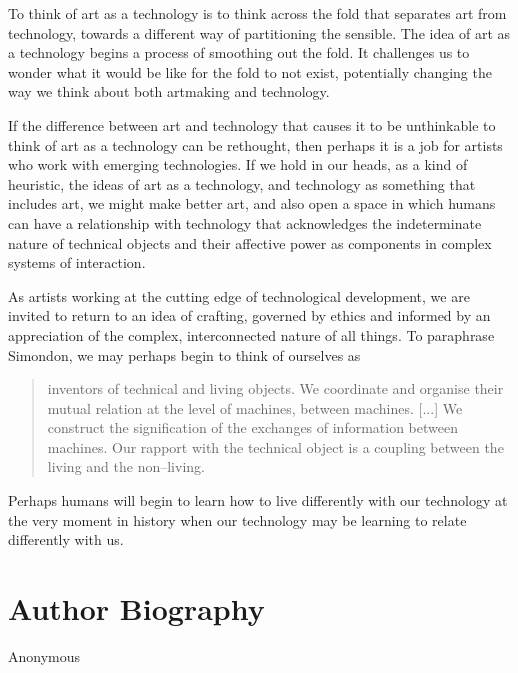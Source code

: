 \documentclass[letterpaper]{article}
\begin{document}
   To think of art as a technology is to think across the fold that separates art from technology, towards a different way of partitioning the sensible. The idea of art as a technology begins a process of smoothing out the fold. It challenges us to wonder what it would be like for the fold to not exist, potentially changing the way we think about both artmaking and technology.
    
    If the difference between art and technology that causes it to be unthinkable to think of art as a technology can be rethought, then perhaps it is a job for artists who work with emerging technologies. If we hold in our heads, as a kind of heuristic, the ideas of art as a technology, and technology as something that includes art, we might make better art, and also open a space in which humans can have a relationship with technology that acknowledges the indeterminate nature of technical objects and their affective power as components in complex systems of interaction.
    
    As artists working at the cutting edge of technological development, we are invited to return to an idea of crafting, governed by ethics and informed by an appreciation of the complex, interconnected nature of all things. To paraphrase Simondon, we may perhaps begin to think of ourselves as
    
    \begin{quote}
        inventors of technical and living objects. We coordinate and organise their mutual relation at the level of machines, between machines. [...] We construct the signification of the exchanges of information between machines. Our rapport with the technical object is a coupling between the living and the non–living. \citep[p.xvi]{SimondonOnThMdOfExstncOfTechnclObjcts1980}
    \end{quote}

    Perhaps humans will begin to learn how to live differently with our technology at the very moment in history when our technology may be learning to relate differently with us.
    



\section{Author Biography}

Anonymous 
\end{document}
